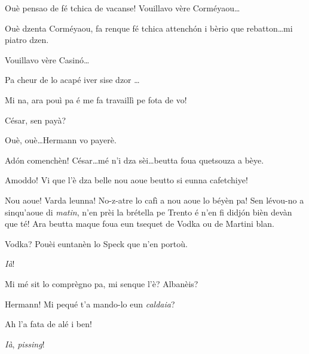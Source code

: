 \begin{drama}
\Peterspeaks{}  Ouè pensao de fé tchica de vacanse! Vouillavo vère Corméyaou\ldots

\Cesarspeaks Ouè dzenta Corméyaou, fa renque fé tchica attench\'on i bèrio que rebatton\ldots mi piatro dzen.

\Peterspeaks Vouillavo vère Casin\'o\ldots

\Cesarspeaks Pa cheur de lo acapé iver sise dzor \ldots

\Peterspeaks Mi na, ara pouì pa é me fa travaillì pe fota de vo!


\Katrinspeaks César, sen payà?

\Cesarspeaks{} Ouè, ouè\ldots Hermann vo payerè.


\Hermannspeaks Ad\'on comenchèn! César\ldots mé n'i dza sèi\ldots beutta foua quetsouza a bèye.

\Cesarspeaks Amoddo! Vi que l'è dza belle nou aoue beutto si eunna cafe\-tchiye!

\Hermannspeaks{} Nou aoue! Varda leunna! No-z-atre lo cafì a nou aoue lo béyèn pa! Sen lévou-no a sinqu'aoue di \textit{matin}, n'en prèi la brétella pe Trento é n'en fi didj\'on bièn devàn que té! Ara beutta maque foua eun tsequet de Vodka ou de Martini blan.

\Peterspeaks {} Vodka? Pouèi euntanèn lo Speck que n'en portoù.

\Hermannspeaks \textit{Ià}!


\Cesarspeaks{} Mi mé sit lo comprègno pa, mi senque l'è? Albanèis?


\Cesarspeaks Hermann! Mi pequé t'a mando-lo eun \textit{caldaia}?


\Cesarspeaks Ah l'a fata de alé i ben!

\Hermannspeaks \textit{Ià}, \textit{pissing}!


\end{drama}
